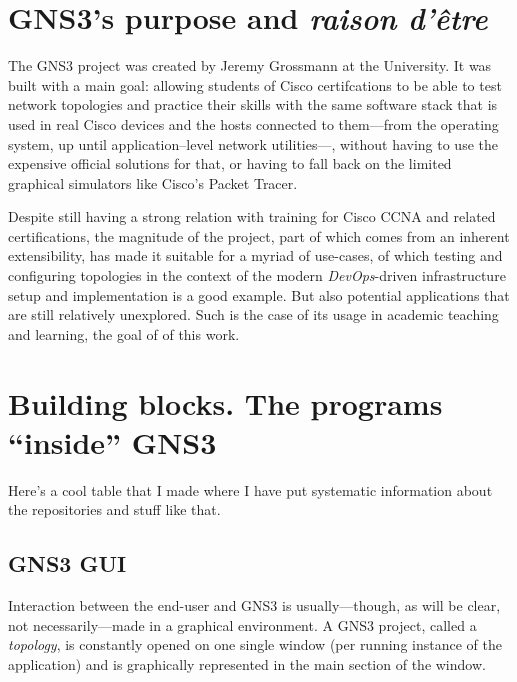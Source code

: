 
\section{GNS3's purpose and \emph{raison d'être}}
\label{sec:gns3why}

The GNS3 project was created by Jeremy Grossmann at the University. %
It was built with a main goal: allowing students of Cisco certifcations to be able to test network topologies and practice their skills with the same software stack that is used in real Cisco devices and the hosts connected to them---from the operating system, up until application--level network utilities---, without having to use the expensive official solutions for that, or having to fall back on the limited graphical simulators like Cisco's Packet Tracer. %

Despite still having a strong relation with training for Cisco CCNA and related certifications, the magnitude of the project, part of which comes from an inherent extensibility, has made it suitable for a myriad of use-cases, of which testing and configuring topologies in the context of the modern \emph{DevOps}-driven infrastructure setup and implementation is a good example.
But also potential applications that are still relatively unexplored.
Such is the case of its usage in academic teaching and learning, the goal of of this work.


\section{Building blocks. The programs ``inside'' GNS3}
\label{sec:gns3buildingblocks}

Here's a cool table that I made where I have put systematic information about the repositories and stuff like that.



\subsection{GNS3 GUI}
\label{subsec:gns3gui}

Interaction between the end-user and GNS3 is usually---though, as will be clear, not necessarily---made in a graphical environment.
A GNS3 project, called a \emph{topology}, is constantly opened on one single window (per running instance of the application) and is graphically represented in the main section of the window.

